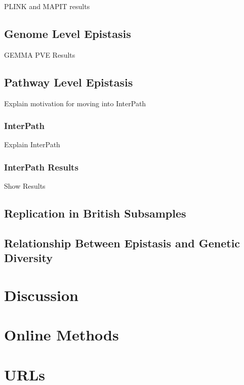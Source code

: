\documentclass[12pt, a4paper]{article}
\begin{document}
PLINK and MAPIT results

\subsection{Genome Level Epistasis}\label{InterPath-Results-SNPEpistasis}

GEMMA PVE Results

\subsection{Pathway Level Epistasis}\label{InterPath-Results-SNPGenomeEpistasis}

Explain motivation for moving into InterPath

\subsubsection{InterPath}

Explain InterPath

\subsubsection{InterPath Results}

Show Results

\subsection{Replication in British Subsamples}

\subsection{Relationship Between Epistasis and Genetic Diversity}

\section{Discussion}\label{InterPath-Discussion}


\section{Online Methods}\label{InterPath-Online-Methods}


\section{URLs}\label{InterPath-URLs}
\end{document}
